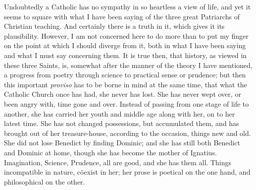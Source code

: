 Undoubtedly a Catholic has no sympathy in so heartless a view of
life, and yet it seems to square with what I have been saying of the
three great Patriarchs of Christian teaching. And certainly there is a
truth in it, which gives it its plausibility. However, I am not
concerned here to do more than to put my finger on the point at which
I should diverge from it, both in what I have been saying and what I
must say concerning them. It is true then, that history, as viewed in
these three Saints, is, somewhat after the manner of the theory I have
mentioned, a progress from poetry through science to practical sense
or prudence; but then this important \emph{proviso} has to be borne in
mind at the same time, that what the Catholic Church once has had, she
never has lost. She has never wept over, or been angry with, time gone
and over. Instead of passing from one stage of life to another, she
has carried her youth and middle age along with her, on to her latest
time. She has not changed possessions, but accumulated them, and has
brought out of her treasure-house, according to the occasion, things
new and old. She did not lose Benedict by finding Dominic; and she has
still both Benedict and Dominic at home, though she has become
the mother of Ignatius. Imagination, Science, Prudence, all are good,
and she has them all. Things incompatible in nature, cöexist in her;
her prose is poetical on the one hand, and philosophical on the other.

